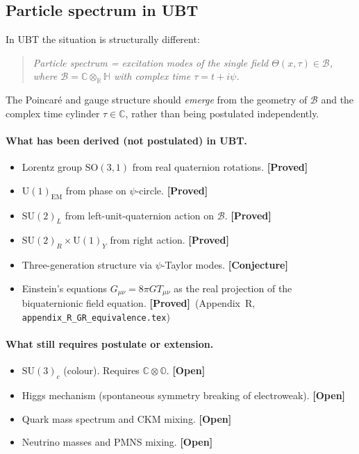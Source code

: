 \documentclass[12pt,a4paper]{article}
\theoremstyle{remark}
\newcommand{\B}{\mathcal{B}}
\newcommand{\C}{\mathbb{C}}
\newcommand{\R}{\mathbb{R}}
\newcommand{\H}{\mathbb{H}}
\newcommand{\proved}{\textbf{[Proved]}}
\newcommand{\conjecture}{\textbf{[Conjecture]}}
\newcommand{\openq}{\textbf{[Open]}}
\begin{document}
\subsection{Particle spectrum in UBT}

In UBT the situation is structurally different:
\begin{quote}
\emph{Particle spectrum = excitation modes of the single field
$\Theta(x,\tau)\in\B$, where $\B = \C\otimes_\R\H$ with complex time
$\tau=t+i\psi$.}
\end{quote}
The Poincaré and gauge structure should \emph{emerge} from the geometry of
$\B$ and the complex time cylinder $\tau\in\C$, rather than being postulated
independently.

\paragraph{What has been derived (not postulated) in UBT.}
\begin{itemize}
  \item Lorentz group $\mathrm{SO}(3,1)$ from real quaternion rotations.
        \proved
  \item $\mathrm{U}(1)_{\mathrm{EM}}$ from phase on $\psi$-circle.  \proved
  \item $\mathrm{SU}(2)_L$ from left-unit-quaternion action on $\B$.  \proved
  \item $\mathrm{SU}(2)_R\times\mathrm{U}(1)_Y$ from right action.  \proved
  \item Three-generation structure via $\psi$-Taylor modes.  \conjecture
  \item Einstein's equations $G_{\mu\nu}=8\pi G T_{\mu\nu}$ as the real
        projection of the biquaternionic field equation.  \proved\
        (Appendix~R, \texttt{appendix\_R\_GR\_equivalence.tex})
\end{itemize}

\paragraph{What still requires postulate or extension.}
\begin{itemize}
  \item $\mathrm{SU}(3)_c$ (colour).  Requires $\C\otimes\mathbb{O}$.
        \openq
  \item Higgs mechanism (spontaneous symmetry breaking of electroweak).
        \openq
  \item Quark mass spectrum and CKM mixing.  \openq
  \item Neutrino masses and PMNS mixing.  \openq
\end{itemize}
\end{document}
